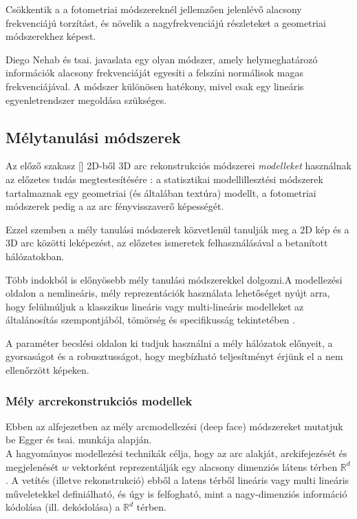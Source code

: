 \documentclass[12pt,a4]{article}
\begin{document}
	Csökkentik a
	a fotometriai módszereknél jellemzően jelenlévő alacsony frekvenciájú torzítást, és
	növelik a nagyfrekvenciájú részleteket a geometriai módszerekhez képest. 
	
	Diego Nehab és tsai. \cite{hibrid} javaslata egy olyan módszer, amely helymeghatározó információk alacsony frekvenciáját egyesíti a felszíni normálisok magas frekvenciájával. 
	A módszer különösen hatékony, mivel csak egy lineáris egyenletrendszer megoldása szükséges.
    
    \subsection{Mélytanulási módszerek}
	
	Az előző szakasz [] 2D-ből 3D arc rekonstrukciós módszerei \textit{modelleket} használnak az előzetes tudás megtestesítésére \cite{survey}: a statisztikai modellillesztési módszerek tartalmaznak egy geometriai (és általában textúra) modellt, a fotometriai módszerek pedig a
	az arc fényvisszaverő képességét. 
	
	
	Ezzel szemben a mély tanulási módszerek
	közvetlenül tanulják meg a 2D kép és a 3D arc közötti leképezést, az előzetes ismeretek felhasználásával a betanított hálózatokban.
	
	
	Több indokból is előnyösebb mély tanulási módszerekkel dolgozni.\cite{3dmm}A modellezési oldalon a nemlineáris, mély reprezentációk használata lehetőséget nyújt arra, hogy felülmúljuk a klasszikus lineáris vagy multi-lineáris modelleket az általánosítás szempontjából, tömörség és specifikusság tekintetében \cite{styner}.
	
	
	A paraméter becslési oldalon ki tudjuk használni a mély hálózatok előnyeit, a gyorsaságot és a robusztusságot, hogy megbízható teljesítményt érjünk el a nem ellenőrzött képeken.
	
	\subsubsection{Mély arcrekonstrukciós modellek}
    Ebben az alfejezetben az mély arcmodellezési (deep face) módszereket mutatjuk be Egger és tsai. \cite{3dmm} munkája alapján. \\
 
	A hagyományos modellezési technikák célja, hogy
	az arc alakját, arckifejezését és megjelenését $w$ vektorként reprezentálják egy
	alacsony dimenziós látens térben $\mathbb{R}^d$ . A vetítés (illetve rekonstrukció) ebből a latens térből lineáris vagy multi lineáris műveletekkel definiálható, és úgy is felfogható, mint a nagy-dimenziós információ kódolása (ill.
	dekódolása) a $\mathbb{R}^d$ térben.
	
\end{document}

